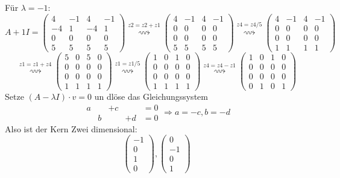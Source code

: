 \documentclass{article} %
\begin{document}
Für $\lambda = -1$:
\[
A +1 I = \begin{pmatrix}
4 & -1 & 4 & -1 \\
-4 & 1 & -4 & 1 \\
0 & 0 & 0 & 0 \\
5 & 5 & 5 & 5
\end{pmatrix} \overset{z2=z2+z1}{\rightsquigarrow} \begin{pmatrix}
4 & -1 & 4 & -1 \\
0 & 0 & 0 & 0 \\
0 & 0 & 0 & 0 \\
5 & 5 & 5 & 5
\end{pmatrix} \overset{z4 = z4/5}{\rightsquigarrow}
\begin{pmatrix}
4 & -1 & 4 & -1 \\
0 & 0 & 0 & 0 \\
0 & 0 & 0 & 0 \\
1 & 1 & 1 & 1
\end{pmatrix}
\]
\[
\overset{z1 = z1+z4}{\rightsquigarrow}
\begin{pmatrix}
5 & 0 & 5 & 0 \\
0 & 0 & 0 & 0 \\
0 & 0 & 0 & 0 \\
1 & 1 & 1 & 1
\end{pmatrix}
\overset{z1 = z1/5}{\rightsquigarrow}
\begin{pmatrix}
1 & 0 & 1 & 0 \\
0 & 0 & 0 & 0 \\
0 & 0 & 0 & 0 \\
1 & 1 & 1 & 1
\end{pmatrix}
\overset{z4 = z4-z1}{\rightsquigarrow}
\begin{pmatrix}
1 & 0 & 1 & 0 \\
0 & 0 & 0 & 0 \\
0 & 0 & 0 & 0 \\
0 & 1 & 0 & 1
\end{pmatrix}
\]
Setze  $(A−\lambda I) \cdot v = 0$ un dlöse das Gleichungssystem 
\[
\begin{array}{rrrrl}
 a &  & +c &  & = 0\\
& b & & +d & =0
\end{array} \Rightarrow a = -c, b =-d 
\]
Also ist der Kern Zwei dimensional: 
\[
\begin{pmatrix}
-1\\0\\1\\0
\end{pmatrix}, \begin{pmatrix}
0\\-1\\0\\1
\end{pmatrix}
\]
\end{document}
